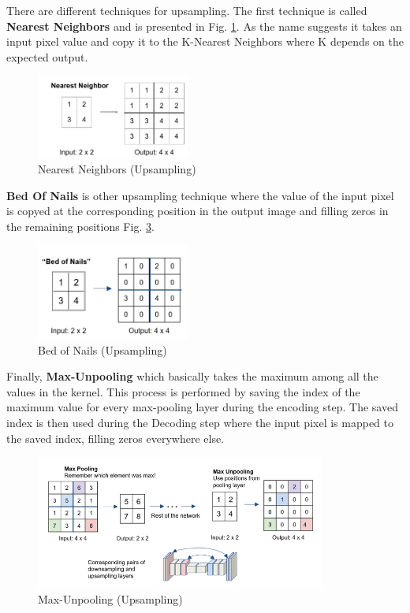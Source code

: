 \documentclass{article}
\begin{document}
There are different techniques for upsampling. The first technique is called \textbf{Nearest Neighbors} and is presented in Fig. \ref{fig:f5}. As the name suggests it takes an input pixel value and copy it to the K-Nearest Neighbors where K depends on the expected output.

\begin{figure}[ht]
    \centering
    \includegraphics[width=0.45\textwidth,height=0.45\textheight,keepaspectratio]{images/nn.png}
    \captionsetup{justification=centering}
    \caption{Nearest Neighbors (Upsampling)}
    \label{fig:f5}
\end{figure}

\textbf{Bed Of Nails} is other upsampling technique where the value of the input pixel is copyed at the corresponding position in the output image and filling zeros in the remaining positions Fig. \ref{fig:f6}.

\begin{figure}[ht]
    \centering
    \includegraphics[width=0.45\textwidth,height=0.45\textheight,keepaspectratio]{images/bn.png}
    \captionsetup{justification=centering}
    \caption{Bed of Nails (Upsampling)}
    \label{fig:f6}
\end{figure}

Finally, \textbf{Max-Unpooling} which basically takes the maximum among all the values in the kernel. This process is performed by saving the index of the maximum value for every max-pooling layer during the encoding step. The saved index is then used during the Decoding step where the input pixel is mapped to the saved index, filling zeros everywhere else.

\begin{figure}[ht]
    \centering
    \includegraphics[width=0.85\textwidth,height=0.85\textheight,keepaspectratio]{images/mn.png}
    \captionsetup{justification=centering}
    \caption{Max-Unpooling (Upsampling)}
    \label{fig:f6}
\end{figure}
\end{document}
